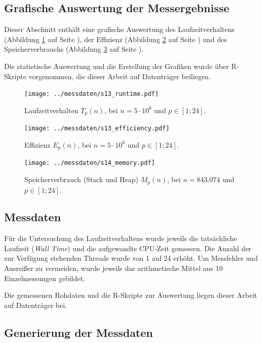 \documentclass[11pt]{scrartcl}
\begin{document}
\subsection{Grafische Auswertung der Messergebnisse}

Dieser Abschnitt enthält eine grafische Auswertung des Laufzeitverhaltens (Abbildung \ref{s13_runtime} auf Seite \pageref{s13_runtime}), der Effizienz (Abbildung \ref{s13_efficiency} auf Seite \pageref{s13_efficiency}) und des Speicherverbrauchs (Abbildung \ref{s14_memory} auf Seite \pageref{s14_memory}).

Die statistische Auswertung und die Erstellung der Grafiken wurde über R-Skripte vorgenommen, die dieser Arbeit auf Datenträger beiliegen.

\begin{figure}[p]
\centering
\texttt{[image: ../messdaten/s13\_runtime.pdf]}
\caption{Laufzeitverhalten $T_p(n)$, bei $n=5\cdot 10^6$ und $p \in [1;24]$.}
\label{s13_runtime}
\end{figure}

\begin{figure}[p]
\centering
\texttt{[image: ../messdaten/s13\_efficiency.pdf]}
\caption{Effizienz $E_p(n)$, bei $n=5\cdot 10^6$ und $p \in [1;24]$.}
\label{s13_efficiency}
\end{figure}

\begin{figure}[p]
\centering
\texttt{[image: ../messdaten/s14\_memory.pdf]}
\caption{Speicherverbrauch (Stack und Heap) $M_p(n)$, bei $n=843.074$ und $p \in [1;24]$.}
\label{s14_memory}
\end{figure}

\subsection{Messdaten}

Für die Untersuchung des Laufzeitverhaltens wurde jeweils die tatsächliche Laufzeit (\emph{Wall Time}) und die aufgewandte CPU-Zeit gemessen. Die Anzahl der zur Verfügung stehenden Threads wurde von 1 auf 24 erhöht. Um Messfehler und Ausreißer zu vermeiden, wurde jeweils das arithmetische Mittel aus 10 Einzelmessungen gebildet.

Die gemessenen Rohdaten und die R-Skripte zur Auswertung liegen dieser Arbeit auf Datenträger bei.

\subsection{Generierung der Messdaten}
\end{document}

